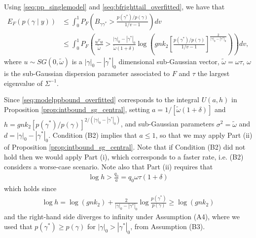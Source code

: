 Using \eqref{seq:pp_singlemodel} and \eqref{seq:bfrighttail_overfitted}, we have that
\begin{align}
 E_F (p(\gamma \mid y)) &\leq 
\int_0^1 P_F \left( B_{\gamma \gamma^*} > \frac{p(\gamma^*)/p(\gamma)}{1/v -1} \right) dv
\nonumber \\
&\leq \int_0^1 P_F \left( \frac{u^T u}{\tilde{\omega}}  > \frac{|\gamma|_0 - |\gamma^*|_0}{\tilde{\omega} (1 + \delta)} \log \left( g n k_2 \left[ \frac{p(\gamma^*)/p(\gamma)}{1/v-1} \right]^{\frac{2}{|\gamma|_0 - |\gamma^*|_0}} \right) \right) dv,
\label{seq:modelppbound_overfitted}
\end{align}
where $u \sim SG(0, \tilde{\omega})$ is a $|\gamma|_0 - |\gamma^*|_0$ dimensional sub-Gaussian vector, $\tilde{\omega}=\omega \tau$, $\omega$ is the sub-Gaussian dispersion parameter associated to $F$ and $\tau$ the largest eigenvalue of $\Sigma^{-1}$.

Since \eqref{seq:modelppbound_overfitted} corresponds to the integral $U(a,h)$ in Proposition \ref{prop:intbound_sg_central}, setting
$a= 1/[\tilde{\omega} (1 + \delta)]$ and $h= gnk_2 [p(\gamma^*)/p(\gamma)]^{2/(|\gamma|_0 - |\gamma^*|_0)}$,
and sub-Gaussian parameters $\sigma^2= \tilde{\omega}$ and $d= |\gamma|_0 - |\gamma^*|_0$.
Condition (B2) implies that $a \leq 1$, so that we may apply Part (ii) of Proposition \ref{prop:intbound_sg_central}. Note that if Condition (B2) did not hold then we would apply Part (i), which corresponds to a faster rate, i.e. (B2) considers a worse-case scenario.
Note also that Part (ii) requires that
\begin{align}
 \log h > \frac{q_0}{a}= q_0 \omega \tau (1+\delta)
\nonumber
\end{align}
which holds since
\begin{align}
\log h= \log(gnk_2) + \frac{2}{|\gamma|_0 - |\gamma^*|_0} \log \frac{p(\gamma^*)}{p(\gamma)} \geq \log(gnk_2)
\label{seq:logh_grows}
\end{align}
and the right-hand side diverges to infinity under Assumption (A4), where we used that $p(\gamma^*) \geq p(\gamma)$ for $|\gamma|_0 > |\gamma^*|_0$, from Assumption (B3).


